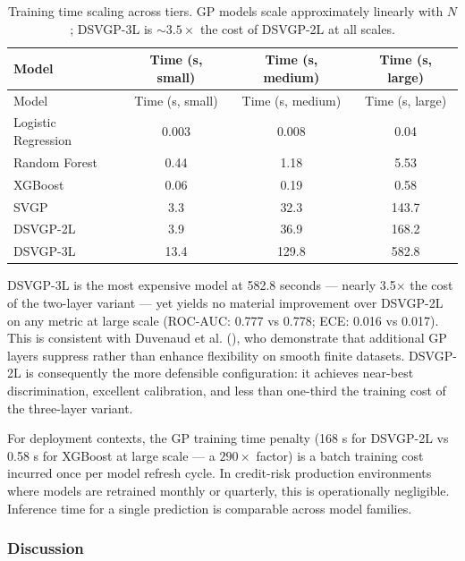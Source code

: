 \documentclass[
  letterpaper,
  DIV=11,
  numbers=noendperiod]{scrartcl}
\begin{document}
\begin{longtable}[]{@{}lccc@{}}
\caption{Training time scaling across tiers. GP models scale
approximately linearly with \(N\); DSVGP-3L is \(\sim 3.5\times\) the
cost of DSVGP-2L at all scales.}\label{tbl-uci-runtime}\tabularnewline
\toprule\noalign{}
Model & Time (s, small) & Time (s, medium) & Time (s, large) \\
\midrule\noalign{}
\endfirsthead
\toprule\noalign{}
Model & Time (s, small) & Time (s, medium) & Time (s, large) \\
\midrule\noalign{}
\endhead
\bottomrule\noalign{}
\endlastfoot
Logistic Regression & 0.003 & 0.008 & 0.04 \\
Random Forest & 0.44 & 1.18 & 5.53 \\
XGBoost & 0.06 & 0.19 & 0.58 \\
SVGP & 3.3 & 32.3 & 143.7 \\
DSVGP-2L & 3.9 & 36.9 & 168.2 \\
DSVGP-3L & 13.4 & 129.8 & 582.8 \\
\end{longtable}

DSVGP-3L is the most expensive model at 582.8 seconds --- nearly
3.5\(\times\) the cost of the two-layer variant --- yet yields no
material improvement over DSVGP-2L on any metric at large scale
(ROC-AUC: 0.777 vs 0.778; ECE: 0.016 vs 0.017). This is consistent with
Duvenaud et al. (), who
demonstrate that additional GP layers suppress rather than enhance
flexibility on smooth finite datasets. DSVGP-2L is consequently the more
defensible configuration: it achieves near-best discrimination,
excellent calibration, and less than one-third the training cost of the
three-layer variant.

For deployment contexts, the GP training time penalty (168 s for
DSVGP-2L vs 0.58 s for XGBoost at large scale --- a \(290\times\)
factor) is a batch training cost incurred once per model refresh cycle.
In credit-risk production environments where models are retrained
monthly or quarterly, this is operationally negligible. Inference time
for a single prediction is comparable across model families.

\subsubsection{Discussion}\label{sec-uci-discussion}
\end{document}

